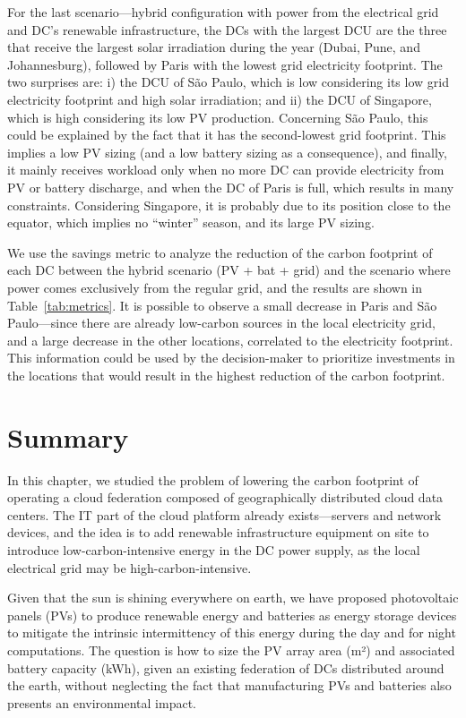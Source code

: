 For the last scenario---hybrid configuration with power from the electrical grid and DC's renewable infrastructure, the DCs with the largest DCU are the three that receive the largest solar irradiation during the year (Dubai, Pune, and Johannesburg), followed by Paris with the lowest grid electricity footprint. The two surprises are: i) the DCU of S\~ao Paulo, which is low considering its low grid electricity footprint and high solar irradiation; and ii) the DCU of Singapore, which is high considering its low PV production. Concerning S\~ao Paulo, this could be explained by the fact that it has the second-lowest grid footprint. This implies a low PV sizing (and a low battery sizing as a consequence), and finally, it mainly receives workload only when no more DC can provide electricity from PV or battery discharge, and when the DC of Paris is full, which results in many constraints. Considering Singapore, it is probably due to its position close to the equator, which implies no ``winter'' season, and its large PV sizing. 

We use the  savings metric to analyze the reduction of the carbon footprint of each DC between the hybrid scenario (PV + bat + grid) and the scenario where power comes exclusively from the regular grid, and the results are shown in Table~\ref{tab:metrics}. It is possible to observe a small decrease in Paris and S\~ao Paulo---since there are already low-carbon sources in the local electricity grid, and a large decrease in the other locations, correlated to the electricity footprint. This information could be used by the decision-maker to prioritize investments in the locations that would result in the highest reduction of the carbon footprint.

\section{Summary}
\label{sec:conclusion_ccgrid}

In this chapter, we studied the problem of lowering the carbon footprint of operating a cloud federation composed of geographically distributed cloud data centers. The IT part of the cloud platform already exists---servers and network devices, and the idea is to add renewable infrastructure equipment on site to introduce low-carbon-intensive energy in the DC power supply, as the local electrical grid may be high-carbon-intensive.

Given that the sun is shining everywhere on earth, we have proposed photovoltaic panels (PVs) to produce renewable energy and batteries as energy storage devices to mitigate the intrinsic intermittency of this energy during the day and for night computations. The question is how to size the PV array area (m²) and associated battery capacity (kWh), given an existing federation of DCs distributed around the earth, without neglecting the fact that manufacturing PVs and batteries also presents an environmental impact. 

